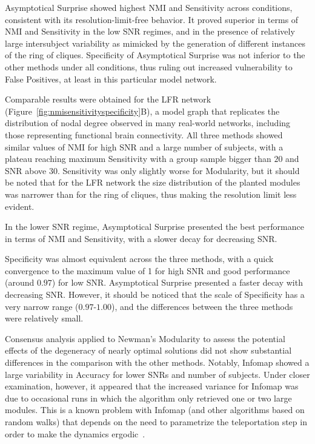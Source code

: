 Asymptotical Surprise showed highest NMI and Sensitivity across conditions, consistent with its resolution-limit-free behavior.
It proved superior in terms of NMI and Sensitivity in the low SNR regimes, and in the presence of relatively large intersubject variability as mimicked by the generation of different instances of the ring of cliques.
Specificity of Asymptotical Surprise was not inferior to the other methods under all conditions, thus ruling out increased vulnerability to False Positives, at least in this particular model network.

Comparable results were obtained for the LFR network (Figure~\ref{fig:nmisensitivityspecificity}B), a model graph that replicates the distribution of nodal degree observed in many real-world networks, including those representing functional brain connectivity.
All three methods showed similar values of NMI for high SNR and a large number of subjects, with a plateau reaching maximum Sensitivity with a group sample bigger than $20$ and SNR above $30$.
Sensitivity was only slightly worse for Modularity, but it should be noted that for the LFR network the size distribution of the planted modules was narrower than for the ring of cliques, thus making the resolution limit less evident.

In the lower SNR regime, Asymptotical Surprise presented the best performance in terms of NMI and Sensitivity, with a slower decay for decreasing SNR.

Specificity was almost equivalent across the three methods, with a quick convergence to the maximum value of 1 for high SNR and good performance (around $0.97$) for low SNR.
Asymptotical Surprise presented a faster decay with decreasing SNR.
However, it should be noticed that the scale of Specificity has a very narrow range ($0.97$-$1.00$), and the differences between the three methods were relatively small.

Consensus analysis applied to Newman's Modularity to assess the potential effects of the degeneracy of nearly optimal solutions did not show substantial differences in the comparison with the other methods.
Notably, Infomap showed a large variability in Accuracy for lower SNRs and number of subjects.
Under closer examination, however, it appeared that the increased variance for Infomap was due to occasional runs in which the algorithm only retrieved one or two large modules.
This is a known problem with Infomap (and other algorithms based on random walks) that depends on the need to parametrize the teleportation step in order to make the dynamics ergodic~\cite{lambiotte2012}.

